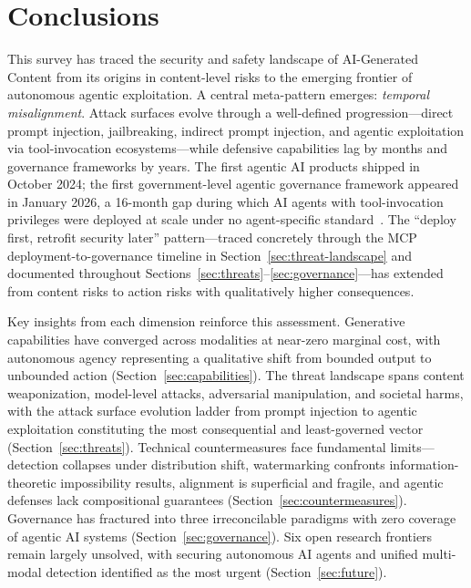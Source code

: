 
\section{Conclusions}
\label{sec:conclusions}

This survey has traced the security and safety landscape of AI-Generated Content from its origins in content-level risks to the emerging frontier of autonomous agentic exploitation. A central meta-pattern emerges: \emph{temporal misalignment}. Attack surfaces evolve through a well-defined progression---direct prompt injection, jailbreaking, indirect prompt injection, and agentic exploitation via tool-invocation ecosystems---while defensive capabilities lag by months and governance frameworks by years. The first agentic AI products shipped in October 2024; the first government-level agentic governance framework appeared in January 2026, a 16-month gap during which AI agents with tool-invocation privileges were deployed at scale under no agent-specific standard~\cite{imda2026agentic}. The ``deploy first, retrofit security later'' pattern---traced concretely through the MCP deployment-to-governance timeline in Section~\ref{sec:threat-landscape} and documented throughout Sections~\ref{sec:threats}--\ref{sec:governance}---has extended from content risks to action risks with qualitatively higher consequences.

Key insights from each dimension reinforce this assessment. Generative capabilities have converged across modalities at near-zero marginal cost, with autonomous agency representing a qualitative shift from bounded output to unbounded action (Section~\ref{sec:capabilities}). The threat landscape spans content weaponization, model-level attacks, adversarial manipulation, and societal harms, with the attack surface evolution ladder from prompt injection to agentic exploitation constituting the most consequential and least-governed vector (Section~\ref{sec:threats}). Technical countermeasures face fundamental limits---detection collapses under distribution shift, watermarking confronts information-theoretic impossibility results, alignment is superficial and fragile, and agentic defenses lack compositional guarantees (Section~\ref{sec:countermeasures}). Governance has fractured into three irreconcilable paradigms with zero coverage of agentic AI systems (Section~\ref{sec:governance}). Six open research frontiers remain largely unsolved, with securing autonomous AI agents and unified multi-modal detection identified as the most urgent (Section~\ref{sec:future}).

